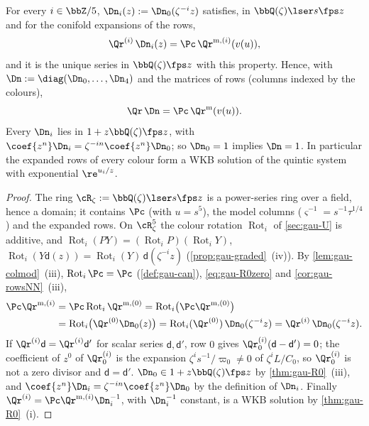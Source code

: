 \begin{cor}
\label{cor:gau-colours}
For every $i\in\bbZ/5$, $\Dn_i(z):=\Dn_0(\zeta^{-i}z)$ satisfies, in $\bbQ(\zeta)\lser s\fps z$ and for the conifold expansions of the rows,
\[
\Qr^{(i)}\,\Dn_i(z)=\Pc\,\Qr^{\mathrm m,(i)}(v(u)),
\]
and it is the unique series in $\bbQ(\zeta)\fps z$ with this property. Hence, with $\Dn:=\diag(\Dn_0,\dots,\Dn_4)$ and the matrices of rows (columns indexed by the colours),
\begin{equation}
\label{eq:gau-R0}
\Qr\,\Dn=\Pc\,\Qr^{\mathrm m}(v(u)).
\end{equation}
Every $\Dn_i$ lies in $1+z\bbQ(\zeta)\fps z$, with $\coef{z^n}\Dn_i=\zeta^{-in}\coef{z^n}\Dn_0$; so $\Dn_0=1$ implies $\Dn=1$. In particular the expanded rows of every colour form a WKB solution of the quintic system with exponential $\re^{u_i/z}$.
\end{cor}

\begin{proof}
The ring $\cR_\zeta:=\bbQ(\zeta)\lser s\fps z$ is a power-series ring over a field, hence a domain; it contains $\Pc$ (with $u=s^5$), the model columns ($\varsigma^{-1}=s^{-1}\tau^{1/4}$) and the expanded rows. On $\cR_\zeta^5$ the colour rotation $\operatorname{Rot}_i$ of \cref{sec:gau-U} is additive, and $\operatorname{Rot}_i(PY)=(\operatorname{Rot}_iP)(\operatorname{Rot}_iY)$, $\operatorname{Rot}_i(Y\mathsf d(z))=\operatorname{Rot}_i(Y)\,\mathsf d(\zeta^{-i}z)$ (\cref{prop:gau-graded}~(iv)). By \cref{lem:gau-colmod}~(iii), $\operatorname{Rot}_i\Pc=\Pc$ (\cref{def:gau-can}), \eqref{eq:gau-R0zero} and \cref{cor:gau-rowsNN}~(iii),
\begin{align*}
\Pc\Qr^{\mathrm m,(i)}&=\Pc\operatorname{Rot}_i\Qr^{\mathrm m,(0)}=\operatorname{Rot}_i\bigl(\Pc\Qr^{\mathrm m,(0)}\bigr)\\
&=\operatorname{Rot}_i\bigl(\Qr^{(0)}\Dn_0(z)\bigr)=\operatorname{Rot}_i(\Qr^{(0)})\,\Dn_0(\zeta^{-i}z)=\Qr^{(i)}\,\Dn_0(\zeta^{-i}z).
\end{align*}
If $\Qr^{(i)}\mathsf d=\Qr^{(i)}\mathsf d'$ for scalar series $\mathsf d,\mathsf d'$, row $0$ gives $\Qr^{(i)}_0(\mathsf d-\mathsf d')=0$; the coefficient of $z^0$ of $\Qr^{(i)}_0$ is the expansion $\zeta^is^{-1}/\varpi_0\neq0$ of $\zeta^iL/C_0$, so $\Qr^{(i)}_0$ is not a zero divisor and $\mathsf d=\mathsf d'$. $\Dn_0\in1+z\bbQ(\zeta)\fps z$ by \cref{thm:gau-R0}~(iii), and $\coef{z^n}\Dn_i=\zeta^{-in}\coef{z^n}\Dn_0$ by the definition of $\Dn_i$. Finally $\Qr^{(i)}=\Pc\Qr^{\mathrm m,(i)}\Dn_i^{-1}$, with $\Dn_i^{-1}$ constant, is a WKB solution by \cref{thm:gau-R0}~(i).
\end{proof}

